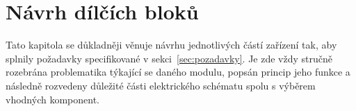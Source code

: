 \chapter{Návrh dílčích bloků}
\label{kap:navrh-dilnich-bloku}
    Tato kapitola se důkladněji věnuje návrhu jednotlivých částí zařízení tak, aby splnily požadavky specifikované v sekci~\ref{sec:pozadavky}. Je zde vždy stručně rozebrána problematika týkající se daného modulu, popsán princip jeho funkce a následně rozvedeny důležité části elektrického schématu spolu s výběrem vhodných komponent.














